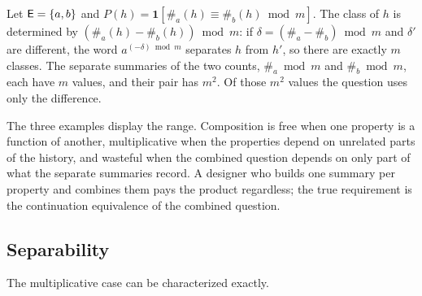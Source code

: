 \begin{example}\label{ex:interaction}
Let $\mathsf{E}=\{a,b\}$ and $P(h)=\mathbf 1[\#_a(h)\equiv\#_b(h)\bmod m]$. The class of $h$ is determined by $(\#_a(h)-\#_b(h))\bmod m$: if $\delta=(\#_a-\#_b)\bmod m$ and $\delta'$ are different, the word $a^{(-\delta)\bmod m}$ separates $h$ from $h'$, so there are exactly $m$ classes. The separate summaries of the two counts, $\#_a\bmod m$ and $\#_b\bmod m$, each have $m$ values, and their pair has $m^{2}$. Of those $m^{2}$ values the question uses only the difference.
\end{example}

The three examples display the range. Composition is free when one property is a function of another, multiplicative when the properties depend on unrelated parts of the history, and wasteful when the combined question depends on only part of what the separate summaries record. A designer who builds one summary per property and combines them pays the product regardless; the true requirement is the continuation equivalence of the combined question.

\subsection{Separability}

The multiplicative case can be characterized exactly.

